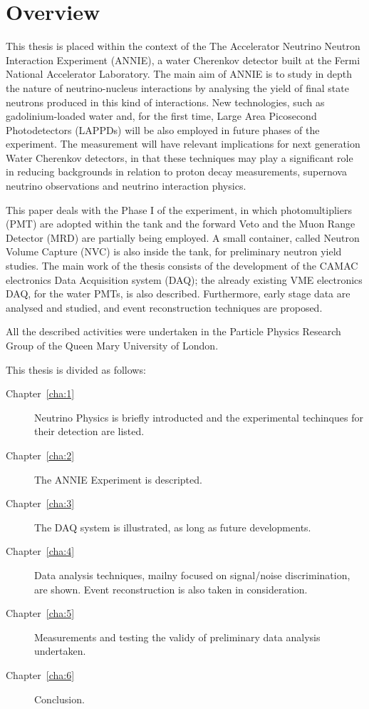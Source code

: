 \clearpage
\pagestyle{plain}
\chapter{Overview}
This thesis is placed within the context of the %
The Accelerator Neutrino Neutron Interaction Experiment (ANNIE), a water Cherenkov %
detector built at the Fermi National Accelerator Laboratory.
The main aim of ANNIE is to study in depth the nature of neutrino-nucleus interactions %
by analysing the yield of final state neutrons produced in this kind of interactions.
New technologies, such as gadolinium-loaded water and, for the first time, %
Large Area Picosecond Photodetectors (LAPPDs) will be also employed in future phases of %
the experiment.
The measurement will have relevant implications for next generation Water Cherenkov detectors, %
in that these techniques may play a significant role %
in reducing backgrounds in relation to proton decay measurements, %
supernova neutrino observations and neutrino interaction physics.

This paper deals with the Phase I of the experiment, in which photomultipliers (PMT) are adopted %
within the tank and the forward Veto and the Muon Range Detector (MRD) are %
partially being employed.
A small container, called Neutron Volume Capture (NVC) %
is also inside the tank, for preliminary neutron yield studies.
The main work of the thesis consists of the development of the CAMAC electronics %
Data Acquisition system (DAQ); the already existing VME electronics DAQ, %
for the water PMTs, is also described.
Furthermore, early stage data are analysed and studied, and event reconstruction %
techniques are proposed.

All the described activities were undertaken in the Particle Physics Research Group of the %
Queen Mary University of London.

\vspace{25mm}
This thesis is divided as follows:
\begin{description}
  \item[Chapter~\ref{cha:1}] Neutrino Physics is briefly introducted and the experimental %
    techinques for their detection are listed.
  \item[Chapter~\ref{cha:2}] The ANNIE Experiment is descripted.
  \item[Chapter~\ref{cha:3}] The DAQ system is illustrated, as long as future developments.
  \item[Chapter~\ref{cha:4}] Data analysis techniques, mailny focused on signal/noise discrimination, %
    are shown. Event reconstruction is also taken in consideration.
  \item[Chapter~\ref{cha:5}] Measurements and testing the validy of preliminary data %
    analysis undertaken.
  \item[Chapter~\ref{cha:6}] Conclusion.
\end{description}
